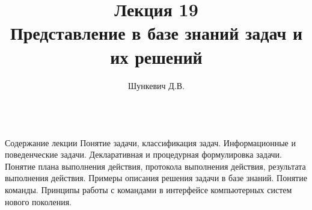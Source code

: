 \title{Лекция 19\\Представление в базе знаний задач и их решений}
\author[]{Шункевич Д.В.}

\begin{frame}
	\titlepage
\end{frame}

\begin{frame}{\\Содержание лекции}
	\topline
	\justifying
	Понятие задачи, классификация задач. Информационные и поведенческие задачи. Декларативная и процедурная формулировка задачи. Понятие плана выполнения действия, протокола выполнения действия, результата выполнения действия. Примеры описания решения задачи в базе знаний. Понятие команды. Принципы работы с командами в интерфейсе компьютерных систем нового поколения. 
\end{frame}